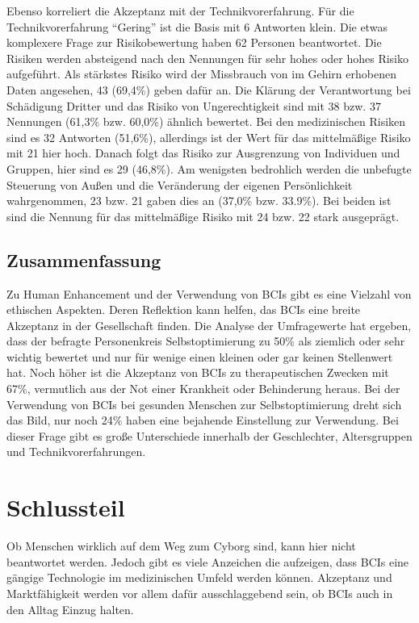 \documentclass[11pt,ngerman,parskip=half]{scrartcl}
\begin{document}
Ebenso korreliert die Akzeptanz mit der Technikvorerfahrung. Für die
Technikvorerfahrung \enquote{Gering} ist die Basis mit 6 Antworten klein.
Die etwas komplexere Frage zur Risikobewertung haben 62 Personen beantwortet.
Die Risiken werden absteigend nach den Nennungen für sehr hohes oder hohes
Risiko aufgeführt. Als stärkstes Risiko wird der Missbrauch von im Gehirn
erhobenen Daten angesehen, 43 (69,4\%) geben dafür an. Die Klärung der
Verantwortung bei Schädigung Dritter und das Risiko von Ungerechtigkeit sind
mit 38 bzw. 37 Nennungen (61,3\% bzw. 60,0\%) ähnlich bewertet. Bei den
medizinischen Risiken sind es 32 Antworten (51,6\%), allerdings ist der Wert
für das mittelmäßige Risiko mit 21 hier hoch. Danach folgt das Risiko zur
Ausgrenzung von Individuen und Gruppen, hier sind es 29 (46,8\%). Am wenigsten
bedrohlich werden die unbefugte Steuerung von Außen und die Veränderung der
eigenen Persönlichkeit wahrgenommen, 23 bzw. 21 gaben dies an (37,0\% bzw.
33.9\%). Bei beiden ist sind die Nennung für das mittelmäßige Risiko mit 24
bzw. 22 stark ausgeprägt.

\subsection{Zusammenfassung}
\label{subsec:kathrin_zusammenfassung}
Zu Human Enhancement und der Verwendung von BCIs gibt es eine Vielzahl von
ethischen Aspekten. Deren Reflektion kann helfen, das BCIs eine breite
Akzeptanz in der Gesellschaft finden. Die Analyse der Umfragewerte hat
ergeben, dass der befragte Personenkreis Selbstoptimierung zu 50\% als
ziemlich oder sehr wichtig bewertet und nur für wenige einen kleinen oder gar
keinen Stellenwert hat. Noch höher ist die Akzeptanz von BCIs zu
therapeutischen Zwecken mit 67\%, vermutlich aus der Not einer Krankheit oder
Behinderung heraus. Bei der Verwendung von BCIs bei gesunden Menschen zur
Selbstoptimierung dreht sich das Bild, nur noch 24\% haben eine bejahende
Einstellung zur Verwendung. Bei dieser Frage gibt es große Unterschiede
innerhalb der Geschlechter, Altersgruppen und Technikvorerfahrungen.

\section{Schlussteil}
Ob Menschen wirklich auf dem Weg zum Cyborg sind, kann hier nicht beantwortet
werden. Jedoch gibt es viele Anzeichen die aufzeigen, dass BCIs eine gängige
Technologie im medizinischen Umfeld werden können. Akzeptanz und
Marktfähigkeit werden vor allem dafür ausschlaggebend sein, ob BCIs auch in
den Alltag Einzug halten.
\end{document}
